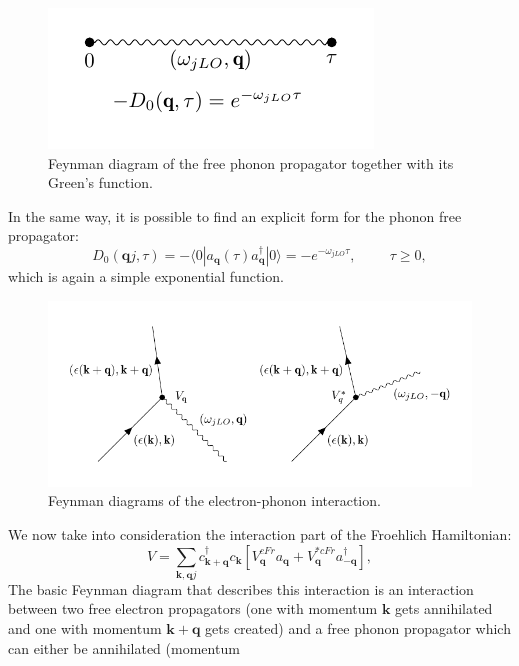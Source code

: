 \begin{figure}[H]
    \centering
    \includegraphics[scale=1.5]{free_ph_propagator.pdf}
    \caption{Feynman diagram of the free phonon propagator together with its Green's function.}
    \label{fig:ph_prop_free}
\end{figure}
In the same way, it is possible to find an explicit form for the phonon free propagator:
\begin{equation}
    D_0(\mathbf{q}j,\tau)=-\langle 0|a_\mathbf{q}(\tau)a^\dagger_\mathbf{q}|0\rangle=-e^{-\omega_{jLO}\tau},\hspace{1cm}\tau\ge0,
\end{equation}
which is again a simple exponential function.
\begin{figure}[H]
    \centering
    \includegraphics[scale=1.0]{interaction_vertex.pdf}
    \caption{Feynman diagrams of the electron-phonon interaction.}
    \label{fig:interaction_vertex}
\end{figure}
We now take into consideration the interaction part of the Froehlich Hamiltonian:
\begin{equation}
    V=\sum_{\mathbf{k},\mathbf{q}j}c^\dagger_{\mathbf{k+q}}c_{\mathbf{k}}\left[V^{cFr}_\mathbf{q}a_\mathbf{q}+V^{*cFr}_\mathbf{q}a^\dagger_\mathbf{-q}\right],
    \label{polaron_interacting}
\end{equation}
The basic Feynman diagram that describes this interaction is an interaction between two free electron propagators (one with momentum 
$\mathbf{k}$ gets annihilated and one with momentum $\mathbf{k+q}$ gets created) and a free phonon propagator which can either be annihilated (momentum 
